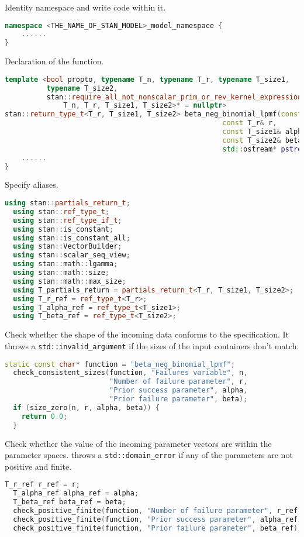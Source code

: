 \documentclass[11pt]{article}
\begin{document}
Identity namespace and write code within it.
\begin{lstlisting}[language=c++, style=lgeneral]
namespace <THE_NAME_OF_STAN_MODEL>_model_namespace {
	......
}
\end{lstlisting}


Declaration of the function.
\begin{lstlisting}[language=c++, style=lgeneral]
template <bool propto, typename T_n, typename T_r, typename T_size1,
          typename T_size2,
          stan::require_all_not_nonscalar_prim_or_rev_kernel_expression_t<
              T_n, T_r, T_size1, T_size2>* = nullptr>
stan::return_type_t<T_r, T_size1, T_size2> beta_neg_binomial_lpmf(const T_n& n, 
                                                    const T_r& r,
                                                    const T_size1& alpha,
                                                    const T_size2& beta,
                                                    std::ostream* pstream__) {	
	......
}
\end{lstlisting}


Specify aliases.
\begin{lstlisting}[language=c++, style=lgeneral]
  using stan::partials_return_t;
  using stan::ref_type_t;
  using stan::ref_type_if_t;
  using stan::is_constant;
  using stan::is_constant_all;
  using stan::VectorBuilder;
  using stan::scalar_seq_view;
  using stan::math::lgamma;
  using stan::math::size;
  using stan::math::max_size;	
  using T_partials_return = partials_return_t<T_r, T_size1, T_size2>;
  using T_r_ref = ref_type_t<T_r>;
  using T_alpha_ref = ref_type_t<T_size1>;
  using T_beta_ref = ref_type_t<T_size2>;
\end{lstlisting}



Check whether the shape of the incoming data conforms to the specification. It throws a \verb|std::invalid_argument| if the sizes of the input containers don't match.
\begin{lstlisting}[language=c++, style=lgeneral]
  static const char* function = "beta_neg_binomial_lpmf";
  check_consistent_sizes(function, "Failures variable", n,
                         "Number of failure parameter", r,
                         "Prior success parameter", alpha,
                         "Prior failure parameter", beta);
  if (size_zero(n, r, alpha, beta)) {
    return 0.0;
  }
\end{lstlisting}



Check whether the value of the incoming parameter vectors are within the parameter spaces.  throws a \verb|std::domain_error| if any of the parameters are not positive and finite.
\begin{lstlisting}[language=c++, style=lgeneral]
  T_r_ref r_ref = r;
  T_alpha_ref alpha_ref = alpha;
  T_beta_ref beta_ref = beta;
  check_positive_finite(function, "Number of failure parameter", r_ref);
  check_positive_finite(function, "Prior success parameter", alpha_ref);
  check_positive_finite(function, "Prior failure parameter", beta_ref);
\end{lstlisting}
\end{document}
